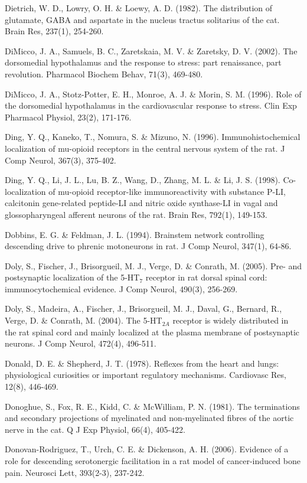 \documentclass[a4paper,12pt,twoside]{report}
\begin{document}
\begin{singlespacing}
\begin{footnotesize}
Dietrich, W. D., Lowry, O. H. \& Loewy, A. D. (1982). The distribution of glutamate, GABA and aspartate in the nucleus tractus solitarius of the cat. Brain Res, 237(1), 254-260.

DiMicco, J. A., Samuels, B. C., Zaretskaia, M. V. \& Zaretsky, D. V. (2002). The dorsomedial hypothalamus and the response to stress: part renaissance, part revolution. Pharmacol Biochem Behav, 71(3), 469-480.

DiMicco, J. A., Stotz-Potter, E. H., Monroe, A. J. \& Morin, S. M. (1996). Role of the dorsomedial hypothalamus in the cardiovascular response to stress. Clin Exp Pharmacol Physiol, 23(2), 171-176.

Ding, Y. Q., Kaneko, T., Nomura, S. \& Mizuno, N. (1996). Immunohistochemical localization of mu-opioid receptors in the central nervous system of the rat. J Comp Neurol, 367(3), 375-402.

Ding, Y. Q., Li, J. L., Lu, B. Z., Wang, D., Zhang, M. L. \& Li, J. S. (1998). Co-localization of mu-opioid receptor-like immunoreactivity with substance P-LI, calcitonin gene-related peptide-LI and nitric oxide synthase-LI in vagal and glossopharyngeal afferent neurons of the rat. Brain Res, 792(1), 149-153.

Dobbins, E. G. \& Feldman, J. L. (1994). Brainstem network controlling descending drive to phrenic motoneurons in rat. J Comp Neurol, 347(1), 64-86.

Doly, S., Fischer, J., Brisorgueil, M. J., Verge, D. \& Conrath, M. (2005). Pre- and postsynaptic localization of the 5-HT$_{7}$ receptor in rat dorsal spinal cord: immunocytochemical evidence. J Comp Neurol, 490(3), 256-269.

Doly, S., Madeira, A., Fischer, J., Brisorgueil, M. J., Daval, G., Bernard, R., Verge, D. \& Conrath, M. (2004). The 5-HT$_{2A}$ receptor is widely distributed in the rat spinal cord and mainly localized at the plasma membrane of postsynaptic neurons. J Comp Neurol, 472(4), 496-511.

Donald, D. E. \& Shepherd, J. T. (1978). Reflexes from the heart and lungs: physiological curiosities or important regulatory mechanisms. Cardiovasc Res, 12(8), 446-469.

Donoghue, S., Fox, R. E., Kidd, C. \& McWilliam, P. N. (1981). The terminations and secondary projections of myelinated and non-myelinated fibres of the aortic nerve in the cat. Q J Exp Physiol, 66(4), 405-422.

Donovan-Rodriguez, T., Urch, C. E. \& Dickenson, A. H. (2006). Evidence of a role for descending serotonergic facilitation in a rat model of cancer-induced bone pain. Neurosci Lett, 393(2-3), 237-242.


\end{footnotesize}
\end{singlespacing}
\end{document}

